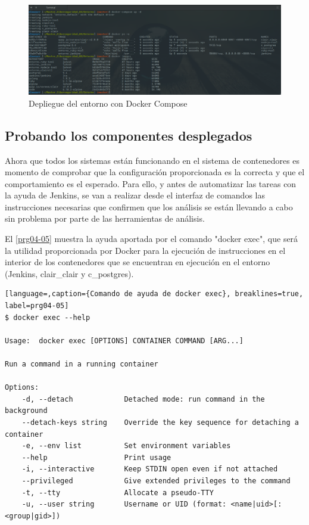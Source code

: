 \begin{figure}[htbp]
	\centering
	\includegraphics[width=1.0\linewidth]
	{desarrollo/figuras/docker-compose-up.png}
	\caption{Depliegue del entorno con Docker Compose}
	\label{compose}
\end{figure}

\subsection{Probando los componentes desplegados}

Ahora que todos los sistemas están funcionando en el sistema de contenedores es momento de comprobar que la configuración proporcionada es la correcta y que el comportamiento es el esperado. Para ello, y antes de automatizar las tareas con la ayuda de Jenkins, se van a realizar desde el interfaz de comandos las instrucciones necesarias que confirmen que los análisis se están llevando a cabo sin problema por parte de las herramientas de análisis.

El \autoref{prg04-05} muestra la ayuda aportada por el comando "docker exec", que será la utilidad proporcionada por Docker para la ejecución de instrucciones en el interior de los contenedores que se encuentran en ejecución en el entorno (Jenkins, clair\_clair y c\_postgres).

\begin{lstlisting}[language=,caption={Comando de ayuda de docker exec}, breaklines=true, label=prg04-05]
$ docker exec --help

Usage:	docker exec [OPTIONS] CONTAINER COMMAND [ARG...]

Run a command in a running container

Options:
	-d, --detach            Detached mode: run command in the background
	--detach-keys string   	Override the key sequence for detaching a container
	-e, --env list          Set environment variables
	--help                 	Print usage
	-i, --interactive       Keep STDIN open even if not attached
	--privileged           	Give extended privileges to the command
	-t, --tty               Allocate a pseudo-TTY
	-u, --user string       Username or UID (format: <name|uid>[:<group|gid>])
\end{lstlisting}

